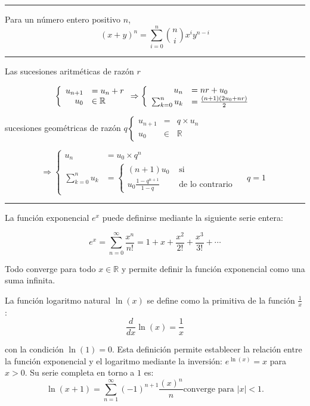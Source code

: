 \hrule
\begin{f}

Para un número entero positivo \(n\),
	\[
	(x+y)^n=\sum_{i=0}^n\binom{n}{i} x^i y^{n-i}
	\]
	
\end{f}
\hrule
\begin{f}[Sucesiones]  
	
	Las sucesiones aritméticas de razón \(r\)
	
	\[
	\left\{\begin{array} { r l } 
		{ u _ { n + 1 } } & { = u _ { n } + r } \\
		{ u _ { 0 } } & { \in \mathbb { R } }
	\end{array} \Rightarrow \left\{\begin{array}{rl}
		u_n & =n r+u_0 \\
		\sum_{k=0}^n u_k & =\frac{(n+1)\left(2 u_0+n r\right)}{2}
	\end{array}\right.\right.
	\]
	
	sucesiones geométricas de razón \(q\left\{\begin{array}{rll}u_{n+1} & = & q \times u_n \\ u_0 & \in & \mathbb{R}\end{array}\right.\)
	
	\[
	\Rightarrow\left\{\begin{array}{rlr}
		u_n & =u_0 \times q^n \\
		\sum_{k=0}^n u_k & =\left\{\begin{array}{rl}
			(n+1) u_0 & \text { si } \\
			u_0 \frac{1-q^{n+1}}{1-q} & \text { de lo contrario }
		\end{array} \quad q=1\right.
	\end{array}\right.
	\]
	
\end{f}
\hrule
\begin{f}
	La función exponencial \( e^x \) puede definirse mediante la siguiente serie entera:
	
	\[
	e^x = \sum_{n=0}^{\infty} \frac{x^n}{n!} = 1 + x + \frac{x^2}{2!} + \frac{x^3}{3!} + \cdots
	\]
	
	Todo converge para todo \( x \in \mathbb{R} \) y permite definir la función exponencial como una suma infinita.
	
	
	La función logaritmo natural \( \ln(x) \) se define como la primitiva de la función \( \frac{1}{x} \) :
	\[
	\frac{d}{dx} \ln(x) = \frac{1}{x}
	\]
	
	con la condición \( \ln(1) = 0 \). Esta definición permite establecer la relación entre la función exponencial y el logaritmo mediante la inversión: \( e^{\ln(x)} = x \) para \( x > 0 \).
	Su serie completa en torno a \(1\) es:
	\[
	\ln(x+1) = \sum_{n=1}^{\infty} (-1)^{n+1}\frac{(x)^n}{n}%
	\text{converge para \(\lvert x\rvert < 1\).}
	\]
	
\end{f}



